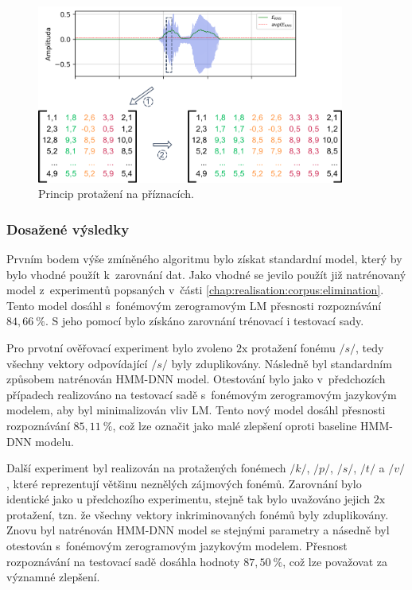 \begin{figure}[hbpt]
  \centering
  \includegraphics[width=0.9\textwidth]{./ch5-construction/img/augmentation_features.pdf}
  \caption{Princip protažení na příznacích.}
  \label{fig:realisation:augmentation:features}
\end{figure}

\subsubsection{Dosažené výsledky}

Prvním bodem výše zmíněného algoritmu bylo získat standardní model, který by bylo vhodné použít  k~zarovnání dat.
Jako vhodné se jevilo použít již natrénovaný model z~experimentů popsaných v~části \ref{chap:realisation:corpus:elimination}.
Tento model dosáhl s~fonémovým zerogramovým LM přesnosti rozpoznávání $84,66~\%$.
S jeho pomocí bylo získáno zarovnání trénovací i testovací sady.

Pro prvotní ověřovací experiment bylo zvoleno $2\mathrm{x}$ protažení fonému $/s/$, tedy všechny vektory odpovídající $/s/$ byly zduplikovány.
Následně byl standardním způsobem natrénován HMM-DNN model.
Otestování bylo jako v~předchozích případech realizováno na testovací sadě s~fonémovým zerogramovým jazykovým modelem, aby byl minimalizován vliv LM.
Tento nový model dosáhl přesnosti rozpoznávání $85,11~\%$, což lze označit jako malé zlepšení oproti baseline HMM-DNN modelu.

Další experiment byl realizován na protažených fonémech $/k/$, $/p/$, $/s/$, $/t/$ a $/v/$, které reprezentují většinu neznělých zájmových fonémů.
Zarovnání bylo identické jako u předchozího experimentu, stejně tak bylo uvažováno jejich $2\mathrm{x}$ protažení, tzn. že všechny vektory inkriminovaných fonémů byly zduplikovány.
Znovu byl natrénován HMM-DNN model se stejnými parametry a násedně byl otestován s~fonémovým zerogramovým jazykovým modelem.
Přesnost rozpoznávání na testovací sadě dosáhla hodnoty $87,50~\%$, což lze považovat za významné zlepšení.

